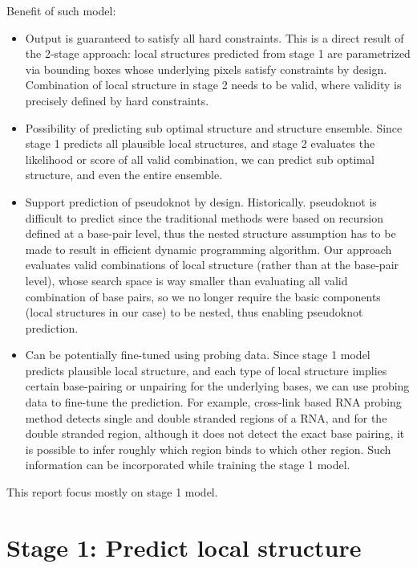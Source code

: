 \documentclass[12pt]{article}
\begin{document}
Benefit of such model:

\begin{itemize}
    \item Output is guaranteed to satisfy all hard constraints.
    This is a direct result of the 2-stage approach:
    local structures predicted from stage 1 are parametrized via bounding boxes whose underlying pixels
    satisfy constraints by design.
    Combination of local structure in stage 2 needs to be valid, where validity is precisely defined by hard constraints.

    \item Possibility of predicting sub optimal structure and structure ensemble.
    Since stage 1 predicts all plausible local structures, and stage 2 evaluates the
    likelihood or score of all valid combination, we can predict sub optimal structure,
    and even the entire ensemble.

    \item Support prediction of pseudoknot by design.
    Historically. pseudoknot is difficult to predict since the traditional methods
    were based on recursion defined at a base-pair level,
    thus the nested structure assumption has to be made to result in efficient
    dynamic programming algorithm.
    Our approach evaluates valid combinations of local structure
    (rather than at the base-pair level), whose search space is way smaller than
    evaluating all valid combination of base pairs, so we no longer require the basic components
    (local structures in our case) to be nested, thus enabling pseudoknot prediction.

    \item Can be potentially fine-tuned using probing data.
    Since stage 1 model predicts plausible local structure, and each type of local structure
    implies certain base-pairing or unpairing for the underlying bases,
    we can use probing data to fine-tune the prediction.
    For example, cross-link based RNA probing method detects single and double stranded regions of a RNA,
    and for the double stranded region, although it does not detect the exact base pairing,
    it is possible to infer roughly which region binds to which other region.
    Such information can be incorporated while training the stage 1 model.

\end{itemize}

This report focus mostly on stage 1 model.


\section{Stage 1: Predict local structure}
\end{document}
